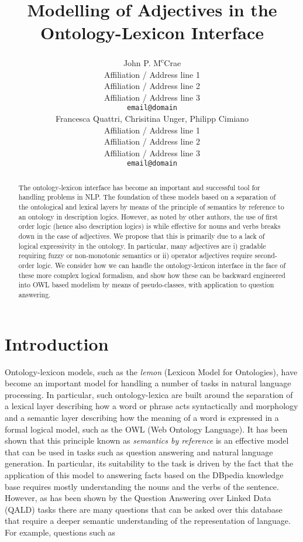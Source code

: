 \documentclass[11pt]{article}
\title{Modelling of Adjectives in the Ontology-Lexicon Interface}
\author{John P. M\textsuperscript{c}Crae \\
  Affiliation / Address line 1 \\
  Affiliation / Address line 2 \\
  Affiliation / Address line 3 \\
  {\tt email@domain} \\\And
  Francesca Quattri, Chrisitina Unger, Philipp Cimiano \\
  Affiliation / Address line 1 \\
  Affiliation / Address line 2 \\
  Affiliation / Address line 3 \\
  {\tt email@domain} \\}
\date{}
\begin{document}
\maketitle
\begin{abstract}
    The ontology-lexicon interface has become an important and successful tool for handling problems in NLP. The foundation of these models based on a separation of the ontological and lexical layers by means of the principle of semantics by reference to an ontology in description logics. However, as noted by other authors, the use of first order logic (hence also description logics) is while effective for nouns and verbs breaks down in the case of adjectives. We propose that this is primarily due to a lack of logical expressivity in the ontology. In particular, many adjectives are i) gradable requiring fuzzy or non-monotonic semantics or ii) operator adjectives require second-order logic. We consider  how we can handle the ontology-lexicon interface in the face of these more complex logical formalism, and show how these can be backward engineered into OWL based modelism by means of pseudo-classes, with application to question answering.
\end{abstract}



\section{Introduction}
\label{intro}

Ontology-lexicon models, such as the \emph{lemon} (Lexicon Model for Ontologies)\cite{mccrae2012interchanging}, have become an important model for handling a number of tasks in natural language processing. In particular, such ontology-lexica are built around the separation of a lexical layer describing how a word or phrase acts syntactically and morphology and a semantic layer describing how the meaning of a word is expressed in a formal logical model, such as the OWL (Web Ontology Language)\cite{mcguinness2004owl}. It has been shown that this principle known as \emph{semantics by reference}\cite{buitelaar2010ontology} is an effective model that can be used in tasks such as question answering\cite{unger2011pythia} and natural language generation\cite{cimiano2013exploiting}. In particular, its suitability to the task is driven by the fact that the application of this model to answering facts based on the DBpedia\cite{auer2007dbpedia} knowledge base requires mostly understanding the nouns and the verbs of the sentence. However, as has been shown by the Question Answering over Linked Data (QALD)\cite{lopez2013evaluating} tasks there are many questions that can be asked over this database that require a deeper semantic understanding of the representation of language. For example, questions such as 
\end{document}
